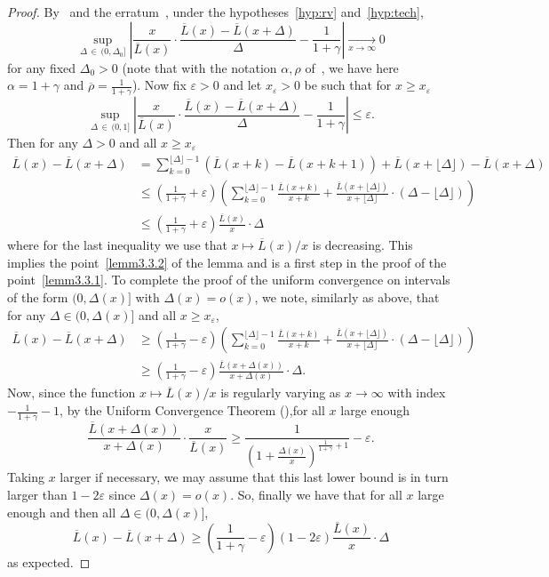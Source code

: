 \documentclass[AHL,Unicode,longabstracts,published]{cedram}
\renewcommand{\bar}[1]{\overline{#1}}
\newcommand*{\MK}{\mkern 2mu}
\begin{document}
\begin{proof}
By~\cite[Theorem~1$\MK$(iii)]{DR13} and the erratum~\cite{DR16_err}, under the hypotheses~\eqref{hyp:rv} and~\eqref{hyp:tech},
\[
\sup_{\Delta\,\in\,(0,\Delta_0]} \left|\frac{x}{\bar L(x)} \cdot \frac{\bar L(x)-\bar L(x+\Delta)}{\Delta} - \frac{1}{1+\gamma}\right| \underset{x \rightarrow \infty}\rightarrow 0
\]
for any fixed $\Delta_0>0$ (note that with the notation $\alpha,\rho$ of~\cite{DR13}, we have here $\alpha=1+\gamma$ and $\bar \rho=\frac{1}{1+\gamma}$). Now fix $\varepsilon>0$ and let $x_{\varepsilon}>0$ be such that for $x \geq x_{\varepsilon}$
\[
\sup_{\Delta\,\in\,(0,1]} \left|\frac{x}{\bar L(x)} \cdot \frac{\bar L(x)-\bar L(x+\Delta)}{\Delta} - \frac{1}{1+\gamma}\right| \leq \varepsilon.
\]
Then for any $\Delta>0$ and all $x \geq x_{\varepsilon}$
\begin{align*}
\bar L(x)-\bar L(x+\Delta) &= \sum_{k=0}^{\lfloor\Delta \rfloor-1} \left(\bar L(x+k)-\bar L(x+k+1)\right)+\bar L(x+\lfloor\Delta \rfloor)-\bar L(x+\Delta) \\
& \leq \left(\frac{1}{1+\gamma} + \varepsilon\right) \left(\sum_{k=0}^{\lfloor\Delta \rfloor-1} \frac{\bar L(x+k)}{x+k} + \frac{\bar L(x+\lfloor\Delta \rfloor)}{x+\lfloor\Delta \rfloor} \cdot (\Delta-\lfloor\Delta \rfloor)\right) \\
& \leq \left(\frac{1}{1+\gamma} + \varepsilon\right) \frac{\bar L(x)}{x} \cdot \Delta
\end{align*}
where for the last inequality we use that $x \mapsto \bar L(x)/x$ is decreasing. This implies the point~\eqref{lemm3.3.2} of the lemma and is a first step in the proof of the point~\eqref{lemm3.3.1}. To complete the proof of the uniform convergence on intervals of the form $(0,\Delta(x)]$ with $\Delta(x)=o(x)$, we note, similarly as above, that for any $\Delta \in (0,\Delta(x)]$ and all $x \geq x_{\varepsilon}$,
\begin{align*}
\bar L(x)-\bar L(x+\Delta) &\geq \left(\frac{1}{1+\gamma} - \varepsilon\right) \left(\sum_{k=0}^{\lfloor\Delta \rfloor-1} \frac{\bar L(x+k)}{x+k} + \frac{\bar L(x+\lfloor\Delta \rfloor)}{x+\lfloor\Delta \rfloor} \cdot (\Delta-\lfloor\Delta \rfloor)\right) \\
&\geq
\left(\frac{1}{1+\gamma} - \varepsilon\right) \frac{\bar L(x+\Delta(x))}{x+\Delta(x)} \cdot \Delta.
\end{align*}
Now, since the function $x \mapsto \bar L(x)/x$ is regularly varying as $x \rightarrow \infty$ with index $-\frac{1}{1+\gamma}-1$, by the Uniform Convergence Theorem (\cite[Theorem~1.5.2]{BGT}),\linebreak for all $x$ large enough
\[
\frac{\bar L(x+\Delta(x))}{x+\Delta(x)} \cdot \frac{x}{\bar L(x)} \geq \frac{1}{\left(1+\frac{\Delta(x)}{x}\right)^{\frac{1}{1+\gamma}+1}}-\varepsilon.
\]
Taking $x$ larger if necessary, we may assume that this last lower bound is in turn larger than $1-2 \varepsilon$ since $\Delta(x)=o(x)$. So, finally we have that for all $x$ large enough and then all $\Delta \in (0,\Delta(x)]$,
\[
\bar L(x)-\bar L(x+\Delta) \geq \left(\frac{1}{1+\gamma} - \varepsilon\right) (1-2\varepsilon) \frac{\bar L(x)}{x} \cdot \Delta
\]
as expected.
\end{proof}
\end{document}
